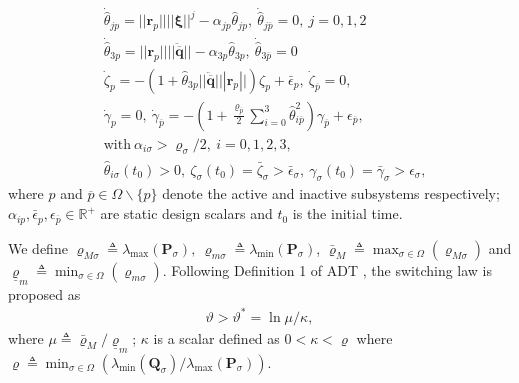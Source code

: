 \begin{subequations}\label{split_adap}
	\begin{align}
	& \dot{\hat{\theta}}_{jp} =|| \mathbf{r}_p|| || \boldsymbol \xi ||^{j} - \alpha_{jp}{\hat{\theta}}_{j p},~\dot{\hat{\theta}}_{j \overline p}=0,~j=0,1,2 \label{hat_theta1}\\
	&\dot{\hat{\theta}}_{3p} =|| \mathbf{r}_p|| || \ddot{\overline{\mathbf q}} || - \alpha_{3p }{\hat{\theta}}_{3 p},~\dot{\hat{\theta}}_{3 \overline p}=0 \label{hat_theta} \\
	& \dot{\zeta}_{p} = - \left(1 + \hat{\theta}_{3p} || \ddot{\overline{\mathbf q}} || | \mathbf{r}_p || \right) {\zeta}_{ p}+  \bar{\epsilon}_{ p},~ \dot{\zeta}_{\overline p} = 0 \label{zeta}, \\
	& \dot{\gamma}_{p} = 0,~ \dot{\gamma}_{\overline p} = - \left(1 + \frac{\varrho_{\overline{p}}}{2} \sum_{i=0}^{3}{\hat{\theta}}_{i \overline p}^2   \right) {\gamma}_{\overline p} +  {\epsilon}_{\overline p} \label{gamma}, \\
	&\text{with}~\alpha_{i\sigma}> \varrho_{\sigma}/2, ~i=0,1,2,3, \label{alpha}\\
	& \hat{\theta}_{i\sigma} (t_0)>0,~\zeta_{\sigma}(t_0)=\bar{\zeta}_{\sigma} > {\bar \epsilon}_{\sigma }, ~ \gamma_{\sigma}(t_0)=\bar{\gamma}_{\sigma} > {\epsilon}_{\sigma },\label{init} 
	\end{align}
\end{subequations}
where $p$ and $\overline{p} \in \Omega \backslash \lbrace p \rbrace$ denote the active and inactive subsystems respectively; $\alpha_{ip},\bar{\epsilon}_p,\epsilon_{\overline{p}} \in \mathbb{R}^{+}$ are static design scalars and $t_0$ is the initial time. 

We define $\varrho_{M \sigma} \triangleq \lambda_{\max}( \mathbf{P}_{\sigma} ),~ \varrho_{m\sigma} \triangleq \lambda_{\min}( \mathbf{P}_{\sigma} )$, ${\bar{\varrho}_M} \triangleq \max_{\sigma \in \Omega}(\varrho_{M\sigma})$ and ${\underline{\varrho}_m} \triangleq \min_{\sigma \in \Omega} (\varrho_{m\sigma})$. Following Definition 1 of ADT \cite{hespanha1999stability}, the switching law is proposed as
\begin{align}
\vartheta > \vartheta^{*} =  \ln \mu/{\kappa},  \label{sw_law}
\end{align}
where $\mu \triangleq {\bar{\varrho}_M} / \underline{\varrho}_{m}$; $\kappa$ is a scalar defined as $0< \kappa < \varrho$ where $\varrho \triangleq \min_{\sigma \in \Omega}({\lambda_{\min}( \mathbf{Q}_{\sigma} )}/{\lambda_{\max}( \mathbf{P}_{\sigma} )})$.

